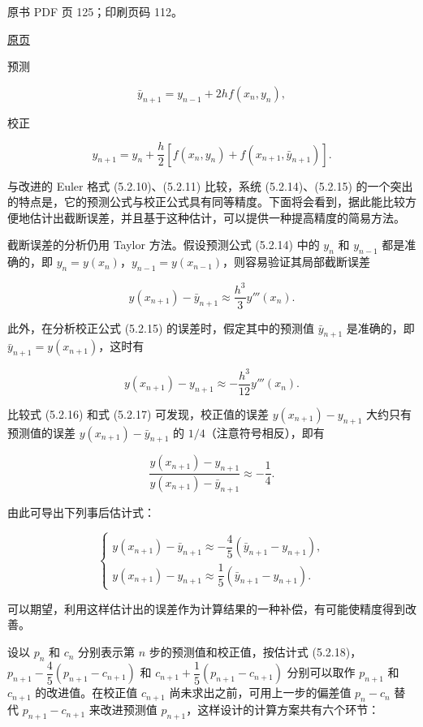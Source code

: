 \clearpage

原书 PDF 页 125；印刷页码 112。

\href{source-images/pdf-125.jpeg}{原页}

预测

\[
\bar y_{n+1}=y_{n-1}+2hf(x_n,y_n),\tag{5.2.14}
\]

校正

\[
y_{n+1}=y_n+\frac{h}{2}[f(x_n,y_n)+f(x_{n+1},\bar y_{n+1})].\tag{5.2.15}
\]

与改进的 Euler 格式 (5.2.10)、(5.2.11) 比较，系统 (5.2.14)、(5.2.15) 的一个突出的特点是，它的预测公式与校正公式具有同等精度。下面将会看到，据此能比较方便地估计出截断误差，并且基于这种估计，可以提供一种提高精度的简易方法。

截断误差的分析仍用 Taylor 方法。假设预测公式 (5.2.14) 中的 \(y_n\) 和 \(y_{n-1}\) 都是准确的，即 \(y_n=y(x_n)\)，\(y_{n-1}=y(x_{n-1})\)，则容易验证其局部截断误差

\[
y(x_{n+1})-\bar y_{n+1}\approx\frac{h^3}{3}y'''(x_n).\tag{5.2.16}
\]

此外，在分析校正公式 (5.2.15) 的误差时，假定其中的预测值 \(\bar y_{n+1}\) 是准确的，即 \(\bar y_{n+1}=y(x_{n+1})\)，这时有

\[
y(x_{n+1})-y_{n+1}\approx-\frac{h^3}{12}y'''(x_n).\tag{5.2.17}
\]

比较式 (5.2.16) 和式 (5.2.17) 可发现，校正值的误差 \(y(x_{n+1})-y_{n+1}\) 大约只有预测值的误差 \(y(x_{n+1})-\bar y_{n+1}\) 的 \(1/4\)（注意符号相反），即有

\[
\frac{y(x_{n+1})-y_{n+1}}{y(x_{n+1})-\bar y_{n+1}}\approx-\frac{1}{4}.
\]

由此可导出下列事后估计式：

\[
\begin{cases}
y(x_{n+1})-\bar y_{n+1}\approx-\dfrac{4}{5}(\bar y_{n+1}-y_{n+1}),\\
y(x_{n+1})-y_{n+1}\approx\dfrac{1}{5}(\bar y_{n+1}-y_{n+1}).
\end{cases}\tag{5.2.18}
\]

可以期望，利用这样估计出的误差作为计算结果的一种补偿，有可能使精度得到改善。

设以 \(p_n\) 和 \(c_n\) 分别表示第 \(n\) 步的预测值和校正值，按估计式 (5.2.18)，\(p_{n+1}-\dfrac{4}{5}(p_{n+1}-c_{n+1})\) 和 \(c_{n+1}+\dfrac{1}{5}(p_{n+1}-c_{n+1})\) 分别可以取作 \(p_{n+1}\) 和 \(c_{n+1}\) 的改进值。在校正值 \(c_{n+1}\) 尚未求出之前，可用上一步的偏差值 \(p_n-c_n\) 替代 \(p_{n+1}-c_{n+1}\) 来改进预测值 \(p_{n+1}\)，这样设计的计算方案共有六个环节：

